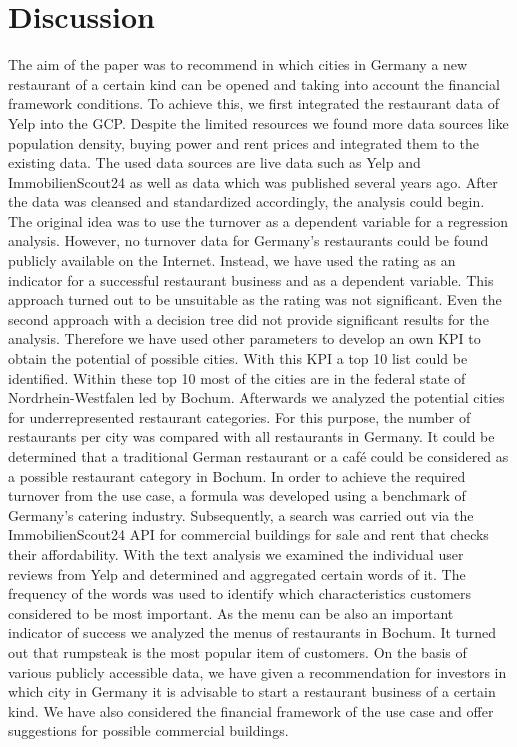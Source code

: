 \section{Discussion}
\label{sec:discussion}
The aim of the paper was to recommend in which cities in Germany a new restaurant of a certain kind can be opened and taking into account the financial framework conditions. To achieve this, we first integrated the restaurant data of Yelp into the \ac{GCP}. Despite the limited resources we found more data sources like population density, buying power and rent prices and integrated them to the existing data. The used data sources are live data such as Yelp and ImmobilienScout24 as well as data which was published several years ago. After the data was cleansed and standardized accordingly, the analysis could begin. The original idea was to use the turnover as a dependent variable for a regression analysis. However, no turnover data for Germany's restaurants could be found publicly available on the Internet. Instead, we have used the rating as an indicator for a successful restaurant business and as a dependent variable. This approach turned out to be unsuitable as the rating was not significant. Even the second approach with a decision tree did not provide significant results for the analysis. Therefore we have used other parameters to develop an own \ac{KPI} to obtain the potential of possible cities. With this \ac{KPI} a top 10 list could be identified. Within these top 10 most of the cities are in the federal state of Nordrhein-Westfalen led by Bochum. Afterwards we analyzed the potential cities for underrepresented restaurant categories. For this purpose, the number of restaurants per city was compared with all restaurants in Germany. It could be determined that a traditional German restaurant or a café could be considered as a possible restaurant category in Bochum.
In order to achieve the required turnover from the use case, a formula was developed using a benchmark of Germany's catering industry. Subsequently, a search was carried out via the ImmobilienScout24 \ac{API} for commercial buildings for sale and rent that checks their affordability. %
With the text analysis we examined the individual user reviews from Yelp and determined and aggregated certain words of it. The frequency of the words was used to identify which characteristics customers considered to be most important. %
As the menu can be also an important indicator of success we analyzed the menus of restaurants in Bochum. It turned out that rumpsteak is the most popular item of customers. \newline
On the basis of various publicly accessible data, we have given a recommendation for investors in which city in Germany it is advisable to start a restaurant business of a certain kind. We have also considered the financial framework of the use case and offer suggestions for possible commercial buildings.

